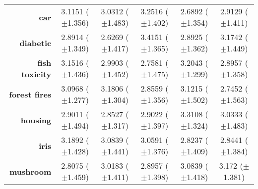 \begin{table}[htb]
{\begin{tabular}{r|ccccc}
                  \textbf{car}                 & \cellcolor[rgb]{ .992,  .729,  .482}3.1151 ($\pm$1.356) & \cellcolor[rgb]{ 1,  .922,  .518}3.0312 ($\pm$1.483)    & \cellcolor[rgb]{ .973,  .412,  .42}3.2516 ($\pm$1.402)  & \cellcolor[rgb]{ .388,  .745,  .482}2.6892 ($\pm$1.354) & \cellcolor[rgb]{ .788,  .859,  .502}2.9129 ($\pm$1.411) \\
                  \textbf{diabetic}            & \cellcolor[rgb]{ .996,  .918,  .514}2.8914 ($\pm$1.349) & \cellcolor[rgb]{ .388,  .745,  .482}2.6269 ($\pm$1.417) & \cellcolor[rgb]{ .973,  .412,  .42}3.4151 ($\pm$1.365)  & \cellcolor[rgb]{ 1,  .922,  .518}2.8925 ($\pm$1.362)    & \cellcolor[rgb]{ .988,  .647,  .467}3.1742 ($\pm$1.449) \\
                  \textbf{fish toxicity}       & \cellcolor[rgb]{ .98,  .541,  .447}3.1516 ($\pm$1.436)  & \cellcolor[rgb]{ 1,  .922,  .518}2.9903 ($\pm$1.452)    & \cellcolor[rgb]{ .388,  .745,  .482}2.7581 ($\pm$1.475) & \cellcolor[rgb]{ .973,  .412,  .42}3.2043 ($\pm$1.299)  & \cellcolor[rgb]{ .749,  .847,  .502}2.8957 ($\pm$1.358) \\
                  \textbf{forest fires}        & \cellcolor[rgb]{ 1,  .922,  .518}3.0968 ($\pm$1.277)    & \cellcolor[rgb]{ .973,  .412,  .42}3.1806 ($\pm$1.304)  & \cellcolor[rgb]{ .58,  .8,  .49}2.8559 ($\pm$1.356)     & \cellcolor[rgb]{ .992,  .773,  .49}3.1215 ($\pm$1.502)  & \cellcolor[rgb]{ .388,  .745,  .482}2.7452 ($\pm$1.563) \\
                  \textbf{housing}             & \cellcolor[rgb]{ .984,  .918,  .514}2.9011 ($\pm$1.494) & \cellcolor[rgb]{ .388,  .745,  .482}2.8527 ($\pm$1.317) & \cellcolor[rgb]{ 1,  .922,  .518}2.9022 ($\pm$1.397)    & \cellcolor[rgb]{ .973,  .412,  .42}3.3108 ($\pm$1.324)  & \cellcolor[rgb]{ .992,  .761,  .486}3.0333 ($\pm$1.483) \\
                  \textbf{iris}                & \cellcolor[rgb]{ .973,  .412,  .42}3.1892 ($\pm$1.428)  & \cellcolor[rgb]{ .996,  .827,  .502}3.0839 ($\pm$1.441) & \cellcolor[rgb]{ 1,  .922,  .518}3.0591 ($\pm$1.376)    & \cellcolor[rgb]{ .388,  .745,  .482}2.8237 ($\pm$1.409) & \cellcolor[rgb]{ .439,  .757,  .482}2.8441 ($\pm$1.384) \\
                  \textbf{mushroom}            & \cellcolor[rgb]{ .388,  .745,  .482}2.8075 ($\pm$1.459) & \cellcolor[rgb]{ 1,  .922,  .518}3.0183 ($\pm$1.411)    & \cellcolor[rgb]{ .643,  .816,  .494}2.8957 ($\pm$1.398) & \cellcolor[rgb]{ .992,  .706,  .478}3.0839 ($\pm$1.418) & \cellcolor[rgb]{ .973,  .412,  .42}3.172 ($\pm$1.381)   \\

\end{tabular}}
\end{table}
